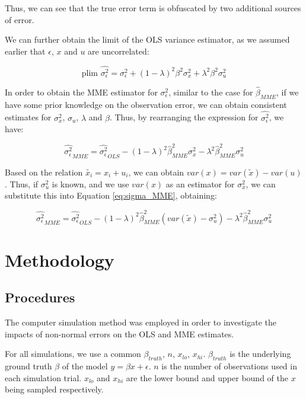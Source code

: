 \documentclass{article}
\begin{document}
Thus, we can see that the true error term is obfuscated by two additional sources of error. 

We can further obtain the limit of the OLS variance estimator, as we assumed earlier that $\epsilon$, $x$ and $u$ are uncorrelated:

\begin{equation}
    \textrm{plim } \hat{\sigma^2_\epsilon} = \sigma_\epsilon^2 + (1-\lambda)^2 \beta^2 \sigma_x^2 + \lambda^2 \beta^2 \sigma_u^2   
\end{equation}

In order to obtain the MME estimator for $\sigma^2_\epsilon$, similar to the case for $\hat{\beta}_{MME}$, if we have some prior knowledge on the observation error, we can obtain consistent estimates for $\sigma_x^2$, $\sigma_u$, $\lambda$ and $\beta$.
Thus, by rearranging the expression for $\hat{\sigma^2_\epsilon}$, we have:

\begin{equation}
    \label{eq:sigma_MME}
    \hat{\sigma_\epsilon^2}_{MME} = \hat{\sigma^2_\epsilon}_{OLS} -  (1-\lambda)^2 \hat{\beta}_{MME}^2 \sigma_x^2 - \lambda^2 \hat{\beta}_{MME}^2 \sigma_u^2   
\end{equation}

Based on the relation $\tilde{x_i} = x_i + u_i$, we can obtain $var(x) = var(\tilde{x}) - var(u)$.
Thus, if $\sigma^2_u$ is known, and we use $var(x)$ as an estimator for $\sigma^2_x$, we can substitute this into Equation \ref{eq:sigma_MME}, obtaining:

\begin{equation}
    \hat{\sigma_\epsilon^2}_{MME} = \hat{\sigma^2_\epsilon}_{OLS} -  (1-\lambda)^2 \hat{\beta}_{MME}^2 (var(\tilde{x}) - \sigma^2_u) - \lambda^2 \hat{\beta}_{MME}^2 \sigma_u^2
\end{equation}

\section{Methodology}

\subsection{Procedures}

The computer simulation method was employed in order to investigate the impacts of non-normal errors on the OLS and MME estimates.

For all simulations, we use a common $\beta_{truth}$, $n$, $x_{lo}$, $x_{hi}$. $\beta_{truth}$ is the underlying ground truth $\beta$ of the model $y=\beta x + \epsilon$. $n$ is the number of observations used in each simulation trial. $x_{lo}$ and $x_{hi}$ are the lower bound and upper bound of the $x$ being sampled respectively.
\end{document}
